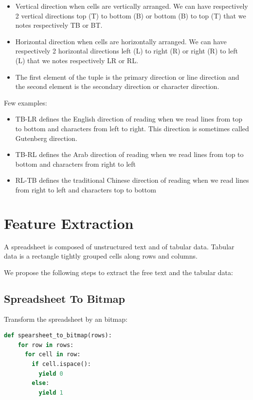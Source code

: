 \documentclass{article}
\begin{document}
\begin{itemize}
    \item Vertical direction when cells are vertically arranged. We can have respectively 2 vertical directions top (T)
    to bottom (B) or bottom (B) to top (T) that we notes respectively TB or BT. 
    \item Horizontal direction when cells are horizontally arranged. We can have respectively 2 horizontal directions
    left (L) to right (R) or right (R) to left (L) that we notes respectively LR or RL. 
    \item The first element of the tuple is the primary direction or line direction and the second element is the
    secondary direction or character direction.
\end{itemize}

Few examples:

\begin{itemize}
    \item TB-LR defines the English direction of reading when we read lines from top to bottom and characters from left
    to right. This direction is sometimes called Gutenberg direction.
    \item TB-RL defines the Arab direction of reading when we read lines from top to bottom and characters from right to
    left
    \item RL-TB defines the traditional Chinese direction of reading when we read lines from right to left and
    characters top to bottom
\end{itemize}

\section{Feature Extraction}
A spreadsheet is composed of unstructured text and of tabular data. Tabular data is a rectangle tightly grouped cells
along rows and columns.

We propose the following steps to extract the free text and the tabular data:

\subsection{Spreadsheet To Bitmap}
Transform the spreadsheet by an bitmap:

\begin{lstlisting}[language=Python, caption=Spreadsheet To Bitmap]
def spearsheet_to_bitmap(rows):
    for row in rows:
      for cell in row:
        if cell.ispace():
          yield 0
        else:
          yield 1
\end{lstlisting}
\end{document}
